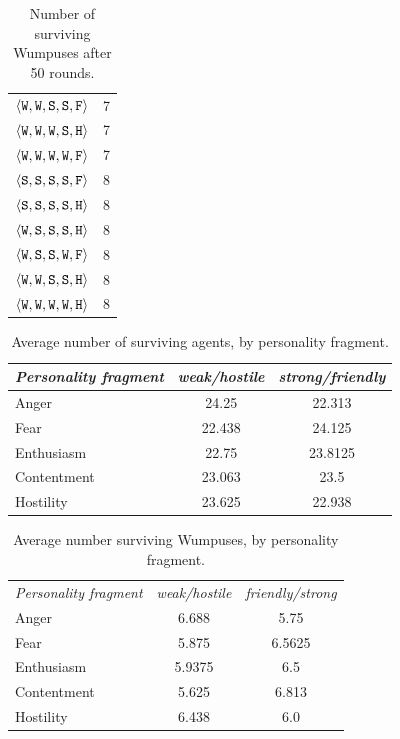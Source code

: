 \begin{table}
{{\begin{minipage}[b]{0.42\hsize}
\begin{tabular}{ l | c }
					$\langle \mathtt{W},\mathtt{W}, \mathtt{S}, \mathtt{S}, \mathtt{F} \rangle$ & 7\\
					$\langle \mathtt{W},\mathtt{W}, \mathtt{W}, \mathtt{S}, \mathtt{H} \rangle$ & 7\\
					$\langle \mathtt{W},\mathtt{W}, \mathtt{W}, \mathtt{W}, \mathtt{F} \rangle$ & 7\\
					$\langle \mathtt{S},\mathtt{S}, \mathtt{S}, \mathtt{S}, \mathtt{F} \rangle$ & 8\\
					$\langle \mathtt{S},\mathtt{S}, \mathtt{S}, \mathtt{S}, \mathtt{H} \rangle$ & 8\\
					$\langle \mathtt{W},\mathtt{S}, \mathtt{S}, \mathtt{S}, \mathtt{H} \rangle$ & 8\\
					$\langle \mathtt{W},\mathtt{S}, \mathtt{S}, \mathtt{W}, \mathtt{F} \rangle$ & 8\\
					$\langle \mathtt{W},\mathtt{W}, \mathtt{S}, \mathtt{S}, \mathtt{H} \rangle$ & 8\\
					$\langle \mathtt{W},\mathtt{W}, \mathtt{W}, \mathtt{W}, \mathtt{H} \rangle$ & 8\\
					\hline
				\end{tabular}
				\caption{Number of surviving Wumpuses after 50 rounds.}
				\label{tab:numWumpuses}
			\end{minipage}
			\hfill
		}}
	\end{table}
	
\begin{table}
	\centering
	\begin{tabular}{ l | c | c }
		\emph{Personality fragment} & \emph{weak/hostile} & \emph{ strong/friendly} \\
		\hline
			Anger & 24.25 & 22.313\\
			Fear & 22.438 & 24.125\\
			Enthusiasm & 22.75 & 23.8125\\
			Contentment & 23.063 & 23.5\\
			Hostility & 23.625 & 22.938\\
		\hline
	\end{tabular}
	\caption{Average number of surviving agents, by personality fragment.}
	\label{tab:numAgentsAvg}
\end{table}

\begin{table}
	\centering
	\begin{tabular}{ l | c | c }
		\emph{Personality fragment} & \emph{weak/hostile} & \emph{friendly/strong} \\
			Anger & 6.688 & 5.75\\
			Fear & 5.875 & 6.5625\\
			Enthusiasm & 5.9375 & 6.5\\
			Contentment & 5.625 & 6.813\\
			Hostility & 6.438 & 6.0\\
		\hline
	\end{tabular}
	\caption{Average number surviving Wumpuses, by personality fragment.}
	\label{tab:numWumpusesAvg}
\end{table}
